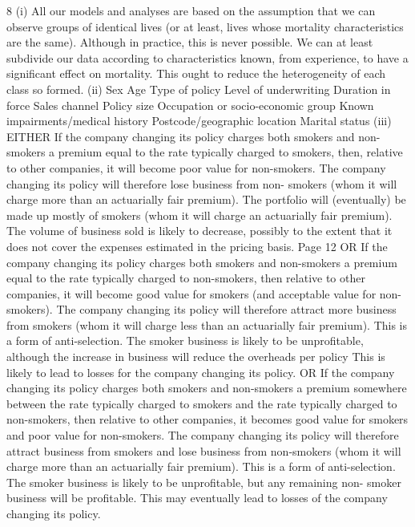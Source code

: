 \documentclass[a4paper,12pt]{article}
\begin{document}
\begin{enumerate}
8
(i)
All our models and analyses are based on the assumption that we can
observe groups of identical lives (or at least, lives whose mortality
characteristics are the same).
Although in practice, this is never possible.
We can at least subdivide our data according to characteristics known, from
experience, to have a significant effect on mortality.
This ought to reduce the heterogeneity of each class so formed.
(ii) Sex
Age
Type of policy
Level of underwriting
Duration in force
Sales channel
Policy size
Occupation or socio-economic group
Known impairments/medical history
Postcode/geographic location
Marital status
(iii) EITHER
If the company changing its policy charges both smokers and non-smokers a
premium equal to the rate typically charged to smokers, then, relative to other
companies, it will become poor value for non-smokers.
The company changing its policy will therefore lose business from non-
smokers (whom it will charge more than an actuarially fair premium).
The portfolio will (eventually) be made up mostly of smokers (whom it will
charge an actuarially fair premium).
The volume of business sold is likely to decrease, possibly to the extent that it
does not cover the expenses estimated in the pricing basis.
Page 12 %
OR
If the company changing its policy charges both smokers and non-smokers a
premium equal to the rate typically charged to non-smokers, then relative to
other companies, it will become good value for smokers (and acceptable value
for non-smokers).
The company changing its policy will therefore attract more business
from smokers (whom it will charge less than an actuarially fair premium).
This is a form of anti-selection.
The smoker business is likely to be unprofitable, although the increase in
business will reduce the overheads per policy
This is likely to lead to losses for the company changing its policy.
OR
If the company changing its policy charges both smokers and non-smokers a
premium somewhere between the rate typically charged to smokers and the
rate typically charged to non-smokers, then relative to other companies, it
becomes good value for smokers and poor value for non-smokers.
The company changing its policy will therefore attract business from smokers
and lose business from non-smokers (whom it will charge more than an
actuarially fair premium). This is a form of anti-selection.
The smoker business is likely to be unprofitable, but any remaining non-
smoker business will be profitable.
This may eventually lead to losses of the company changing its policy.

\end{enumerate}
\end{document}
